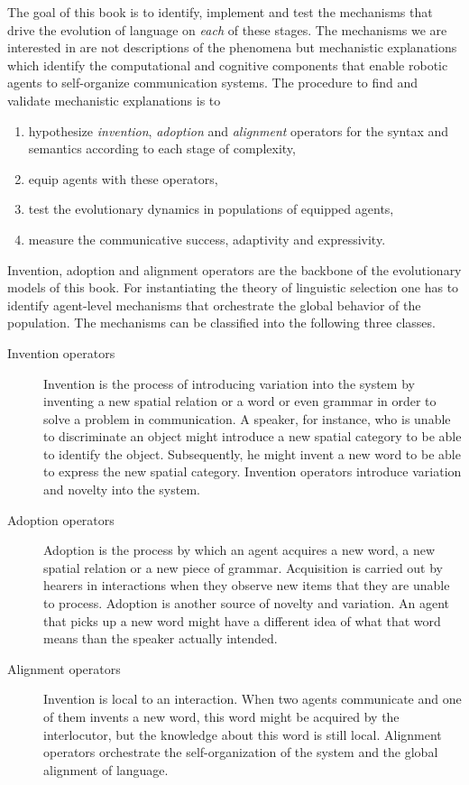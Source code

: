 The goal of this book is to identify, implement and test the mechanisms that drive 
the evolution of language on \emph{each} of these stages. The mechanisms 
we are interested in are not descriptions of the phenomena but mechanistic explanations 
which identify the computational and cognitive components
that enable robotic agents to self-organize communication systems.
The procedure to find and validate mechanistic explanations is to
\begin{enumerate} 
\item hypothesize \emph{invention}, \emph{adoption} and \emph{alignment} operators for the syntax and semantics
according to each stage of complexity,
\item equip agents with these operators,
\item test the evolutionary dynamics in populations of equipped agents,
\item measure the communicative success, adaptivity and expressivity.
\end{enumerate}
Invention, adoption and alignment operators are the backbone of the evolutionary models 
of this book. For instantiating the theory of linguistic selection one has to identify 
agent-level mechanisms that orchestrate the global behavior of the population. The mechanisms 
can be classified into the following three classes.
\begin{description}
\item[Invention operators] Invention is the process of introducing variation 
into the system by inventing a new spatial relation or a word or even grammar
in order to solve a problem in communication. A speaker, for instance,
who is unable to discriminate an object might introduce a new spatial
category to be able to identify the object. Subsequently, he might invent
a new word to be able to express the new spatial category.
Invention operators introduce variation and novelty into the system.
\item[Adoption operators] Adoption is the process by which an
agent acquires a new word, a new spatial relation or a new piece of grammar.
Acquisition is carried out by hearers in interactions when they observe
new items that they are unable to process.
Adoption is another source of novelty and variation. An agent that
picks up a new word might have a different idea of what that word
means than the speaker actually intended. 
\item[Alignment operators] Invention is local to an interaction. When two
agents communicate and one of them invents a new word, this word
might be acquired by the interlocutor, but the knowledge about this 
word is still local. Alignment operators orchestrate the self-organization
of the system and the global alignment of language.
\end{description}


